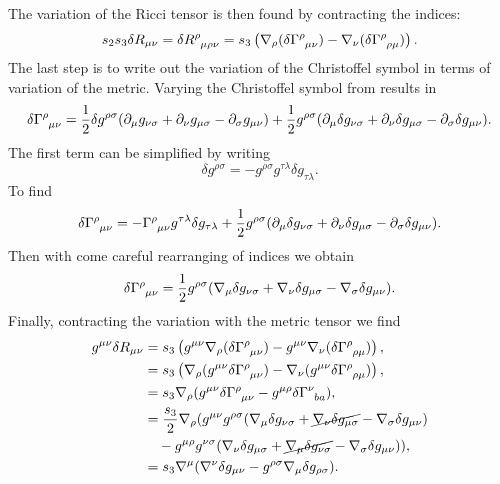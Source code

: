 The variation of the Ricci tensor is then found by contracting the indices:
\begin{equation*}
		s_2 s_3 \delta R_{\mu \nu} = \delta \tensor{R}{^\rho_{\mu \rho \nu}} = s_3 \left( \nabla_\rho (\delta \tensor{\Gamma}{^\rho_{\mu \nu}}) - \nabla_\nu (\delta \tensor{\Gamma}{^\rho_{\rho \mu}}) \right).
\end{equation*} 
The last step is to write out the variation of the Christoffel symbol in terms of variation of the metric. Varying the Christoffel symbol from  results in
\begin{equation*}
	\delta \tensor{\Gamma}{^\rho_{\mu \nu}} = \half \delta g^{\rho \sigma} (\partial_\mu g_{\nu \sigma} + \partial_\nu g_{\mu \sigma} - \partial_\sigma g_{\mu \nu}) + \half g^{\rho \sigma} (\partial_\mu \delta g_{\nu \sigma} + \partial_\nu \delta g_{\mu \sigma} - \partial_\sigma \delta g_{\mu \nu}).
\end{equation*}
The first term can be simplified by writing
\begin{equation*}
	\delta g^{\rho \sigma} = - g^{\rho \sigma} g^{\tau \lambda} \delta g_{\tau \lambda}.
\end{equation*}
To find
\begin{equation*}
	\delta \tensor{\Gamma}{^\rho_{\mu \nu}} = -\tensor{\Gamma}{^\rho_{\mu \nu}} g^{\tau \lambda} \delta g_{\tau \lambda} + \half g^{\rho \sigma} (\partial_\mu \delta g_{\nu \sigma} + \partial_\nu \delta g_{\mu \sigma} - \partial_\sigma \delta g_{\mu \nu}).
\end{equation*}
Then with come careful rearranging of indices we obtain
\begin{equation*}
	\delta \tensor{\Gamma}{^\rho_{\mu \nu}} = \half g^{\rho \sigma} (\nabla_\mu \delta g_{\nu \sigma} + \nabla_\nu \delta g_{\mu \sigma} - \nabla_\sigma \delta g_{\mu \nu}).
\end{equation*}
Finally, contracting the variation with the metric tensor we find
\begin{equation*}
	\begin{aligned}
		g^{\mu \nu} \delta R_{\mu \nu} &= s_3 \left( g^{\mu \nu} \nabla_\rho (\delta \tensor{\Gamma}{^\rho_{\mu \nu}}) - g^{\mu \nu} \nabla_\nu (\delta \tensor{\Gamma}{^\rho_{\rho \mu}}) \right), \\
		&= s_3  \left( \nabla_\rho (g^{\mu \nu}\delta \tensor{\Gamma}{^\rho_{\mu \nu}}) - \nabla_\nu (g^{\mu \nu} \delta \tensor{\Gamma}{^\rho_{\rho \mu}}) \right),\\
		&= s_3 \nabla_\rho (g^{\mu \nu}\delta \tensor{\Gamma}{^\rho_{\mu \nu}} - g^{\mu \rho} \delta \tensor{\Gamma}{^\nu_{ba}}), \\
		&= \frac{s_3}{2} \nabla_\rho (g^{\mu \nu} g^{\rho \sigma} (\nabla_\mu \delta g_{\nu \sigma} + \cancel{\nabla_\nu \delta g_{\mu \sigma}} - \nabla_\sigma \delta g_{\mu \nu}) \\
		&\quad -  g^{\mu \rho}  g^{\nu \sigma} (\nabla_\nu \delta g_{\mu \sigma} + \cancel{\nabla_\mu \delta g_{\nu \sigma}} - \nabla_\sigma \delta g_{\mu \nu}) ), \\
		&= s_3 \nabla^\mu (\nabla^\nu \delta g_{\mu \nu} - g^{\rho \sigma} \nabla_\mu \delta g_{\rho \sigma}).
	\end{aligned}
\end{equation*}
